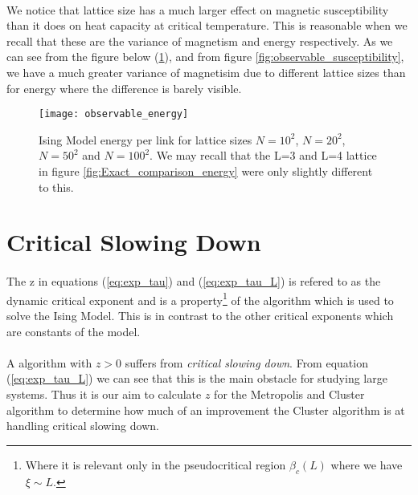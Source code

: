 \documentclass[12pt] {report} %
\begin{document}
			\paragraph{}
				We notice that lattice size has a much larger effect on magnetic susceptibility than it does on heat capacity at critical temperature. This is reasonable when we recall that these are the variance of magnetism and energy respectively. As we can see from the figure below (\ref{fig:observable_energy}), and from figure \ref{fig:observable_susceptibility}, we have a much greater variance of magnetisim due to different lattice sizes than for energy where the difference is barely visible.
			
			\begin{figure}[H]
				\centering
				\texttt{[image: observable\_energy]}
				\caption{Ising Model energy per link for lattice sizes $N = 10^2$, $N = 20^2$, $N = 50^2$ and $N = 100^2$. We may recall that the L=3 and L=4 lattice in figure \ref{fig:Exact_comparison_energy} were only slightly different to this.}
				\label{fig:observable_energy}
			\end{figure}				
				
				
		\section{Critical Slowing Down}
			
			\paragraph{}
				The z in equations (\ref{eq:exp_tau}) and (\ref{eq:exp_tau_L}) is refered to as the dynamic critical exponent and is a property\footnote{Where it is relevant only in the pseudocritical region $\beta_c(L)$ where we have $\xi \sim L$.} of the algorithm which is used to solve the Ising Model. This is in contrast to the other critical exponents which are constants of the model.
				
			\paragraph{}
				A algorithm with $z > 0$ suffers from \textit{critical slowing down}. From equation (\ref{eq:exp_tau_L}) we can see that this is the main obstacle for studying large systems. Thus it is our aim to calculate $z$ for the Metropolis and Cluster algorithm to determine how much of an improvement the Cluster algorithm is at handling critical slowing down.
				
\end{document}
